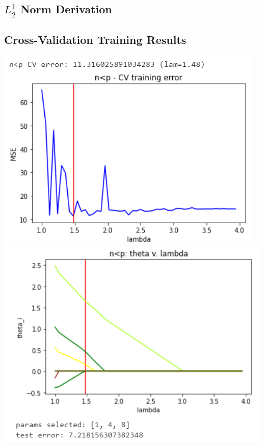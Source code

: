 \documentclass[11pt]{article}
\begin{document}
\subsection{$L\frac{1}{2}$ Norm Derivation}

\subsection{Cross-Validation Training Results}
\label{cvtr}
\begin{center}
\includegraphics[scale=0.7]{charts/lasso_ortho_n_lt_p_err.PNG}
\includegraphics[scale=0.7]{charts/lasso_ortho_n_lt_p_thetas.PNG}


\end{center}
\end{document}
